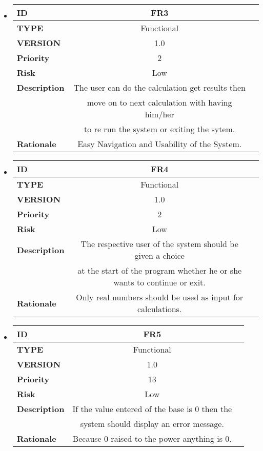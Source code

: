 \documentclass[a4paper,12pt]{article}
\begin{document}
\begin{itemize}
\begin{tabular}{|| l ||c  | c||}
	\end{tabular}
	
\item	\begin{tabular}{|| l ||c  | c||}
		\hline \hline
		\textbf{ID} & FR3  \\ 
		\hline
		\textbf{TYPE} & Functional   \\
		\hline
		\textbf{VERSION} & 1.0  \\ 
		\hline
		\textbf{Priority} & 2  \\
		\hline
		\textbf{Risk} & Low  \\ 
		\hline
		\textbf{Description} & The user can do the calculation get results then \\& move on to next calculation with having him/her\\& to re run the system or exiting the sytem.\\
		\hline
		\textbf{Rationale} & Easy Navigation and Usability of the System.\\
		\hline
		
	\end{tabular}
	
	
\item	\begin{tabular}{|| l ||c  | c||}
		\hline \hline
		\textbf{ID} & FR4  \\ 
		\hline
		\textbf{TYPE} & Functional   \\
		\hline
		\textbf{VERSION} & 1.0  \\ 
		\hline
		\textbf{Priority} & 2  \\
		\hline
		\textbf{Risk} & Low  \\ 
		\hline
		\textbf{Description} & The respective user of the system should be given a choice \\ & at the start of the program whether he or she wants to continue or exit.\\
		\hline
		\textbf{Rationale} & Only real numbers should be used as input for calculations.   \\
		\hline
		
	\end{tabular}
	
\item		\begin{tabular}{|| l ||c  | c||}
		\hline \hline
		\textbf{ID} & FR5  \\ 
		\hline
		\textbf{TYPE} & Functional   \\
		\hline
		\textbf{VERSION} & 1.0  \\ 
		\hline
		\textbf{Priority} & 13 \\
		\hline
		\textbf{Risk} & Low  \\ 
		\hline
		\textbf{Description} & If the value entered of the base is 0 then the \\& system should display an error message. \\
		\hline
		\textbf{Rationale} & Because 0 raised to the power anything is 0.   \\
		\hline
		

\end{tabular}
\end{itemize}
\end{document}
